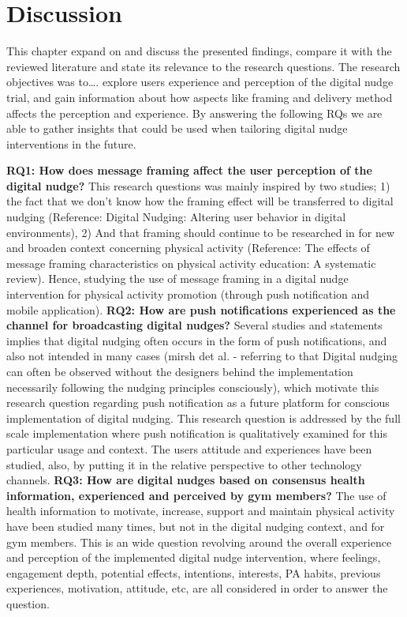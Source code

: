 \chapter{Discussion}
This chapter expand on and discuss the presented findings, compare it with the reviewed literature and state its relevance to the research questions. The research objectives was to…. explore users experience and perception of the digital nudge trial, and gain information about how aspects like framing and delivery method affects the perception and experience. By answering the following RQs we are able to gather insights that could be used when tailoring digital nudge interventions in the future. 

\bigbreak
\textbf{RQ1: How does message framing affect the user perception of the digital nudge?}
\bigbreak
This research questions was mainly inspired by two studies; 1) the fact that we don't know how the framing effect will be transferred to digital nudging (Reference: Digital Nudging: Altering user behavior in digital environments), 2) And that framing should continue to be researched in for new and broaden context concerning physical activity (Reference: The effects of message framing characteristics on physical activity education: A systematic review). Hence, studying the use of message framing in a digital nudge intervention for physical activity promotion (through push notification and mobile application). 
\bigbreak
\textbf{RQ2: How are push notifications experienced as the channel for broadcasting digital nudges?}
\bigbreak
Several studies and statements implies that digital nudging often occurs in the form of push notifications, and also not intended in many cases (mirsh det al. - referring to that Digital nudging can often be observed without the designers behind the implementation necessarily following the nudging principles consciously), which motivate this research question regarding push notification as a future platform for conscious implementation of digital nudging. This research question is addressed by the full scale implementation where push notification is qualitatively examined for this particular usage and context. The users attitude and experiences have been studied, also, by putting it in the relative perspective to other technology channels. 
\bigbreak
\textbf{RQ3: How are digital nudges based on consensus health information, experienced and perceived by gym members? }
\bigbreak
The use of health information to motivate, increase, support and maintain physical activity have been studied many times, but not in the digital nudging context, and for gym members. This is an wide question revolving around the overall experience and perception of the implemented digital nudge intervention, where feelings, engagement depth, potential effects, intentions, interests, PA habits, previous experiences, motivation, attitude, etc, are all considered in order to answer the question. 

